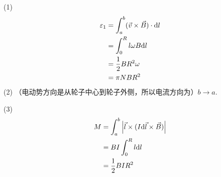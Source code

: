 (1) 
\begin{align*}
\varepsilon_1&=\int_{a}^{b}(\vec{v}\times\vec{B})\cdot\mathrm{d}l\\
&=\int_{0}^{R}l\omega B\mathrm{d}l\\
&=\dfrac{1}{2}BR^2\omega\\
&=\pi NBR^2
\end{align*}
(2) （电动势方向是从轮子中心到轮子外侧，所以电流方向为）$b\rightarrow a$.

(3)
\begin{align*}
M&=\int_{a}^{b}\left|\vec{l}\times(I\mathrm{d}\vec{l}\times\vec{B})\right|\\
&=BI\int_{0}^{R}l\mathrm{d}l\\
&=\dfrac{1}{2}BIR^2
\end{align*}